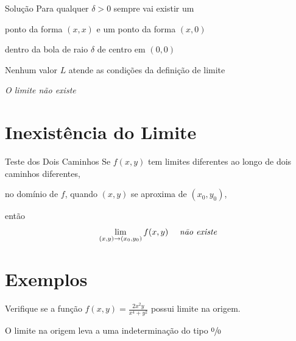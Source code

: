 \documentclass[fleqn,utf8,aspectratio=169,12pt,ignorenonframetext]{beamer}
\begin{document}
\begin{resolution}{Solução}
  Para qualquer $\delta>0$
  \pause
  sempre vai existir um

  ponto da forma \((x, x)\) e um ponto da forma \((x, 0)\)

  \pause
  dentro da bola de raio $\delta$ de centro em \((0, 0)\)

  \pause
  Nenhum valor $L$ atende as condições da definição de limite

  \pause
  \vspace{\baselineskip}
  \emph{O limite não existe}
\end{resolution}

\section{Inexistência do Limite}

\begin{frame}{Teste dos Dois Caminhos}
  Se \(f(x, y)\) tem limites diferentes ao longo de dois caminhos
  diferentes,

  no domínio de $f$,
  \pause
  quando $(x, y)$ se aproxima de $(x_0, y_0)$,

  \pause
  então
  \[
    \lim_{(x, y)\to(x_0, y_0)} f(x, y) \quad \text{ \emph{não existe}}
  \]
\end{frame}

\section{Exemplos}

\begin{question}
  Verifique se a função
  \(
  f(x, y) = \frac{2x^2y}{x^4+y^2}
  \)
  possui limite na origem.

  \pause
  \vspace{\baselineskip}
  O limite na origem leva a uma indeterminação do tipo $\sfrac{0}{0}$
\end{question}
\end{document}
